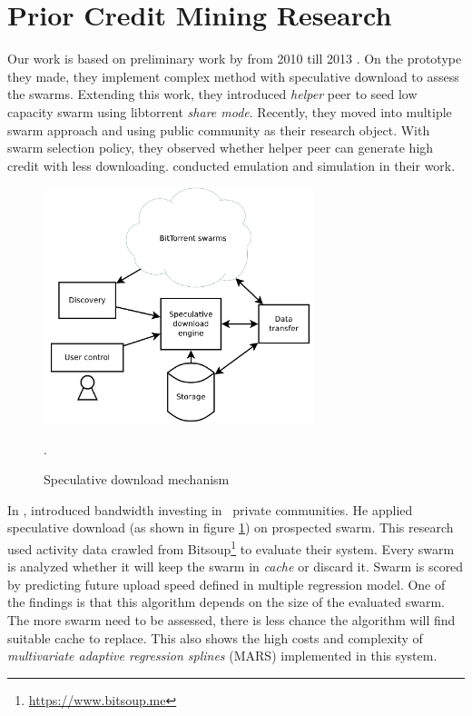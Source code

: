 

\section{Prior Credit Mining Research}
\label{section:cmprior}
Our work is based on preliminary work by \citeauthor{2015:creditmining:capota} from 2010 till 2013 \cite{2015:creditmining:capota, 2013:investmentcm:capota, 2014:bwmarket:capota}. On the prototype they made, they implement complex method with speculative download to assess the swarms\cite{2013:investmentcm:capota}. Extending this work, they introduced \textit{helper} peer to seed low capacity swarm using libtorrent \textit{share mode}\cite{2014:bwmarket:capota}. Recently, they moved into multiple swarm approach and using public community as their research object. With swarm selection policy, they observed whether helper peer can generate high credit with less downloading\cite{2015:creditmining:capota}. \citeauthor{2015:creditmining:capota} conducted emulation and simulation in their work.

\begin{figure}[t]
	\centering
	\includegraphics[width=0.7\textwidth]{pics/SDE2013.png}
	\caption{Speculative download mechanism \cite{2013:investmentcm:capota}}.
	\label{fig:sde13}
\end{figure}

In \citeyear{2013:investmentcm:capota}, \citeauthor{2013:investmentcm:capota} introduced bandwidth investing in \bt~private communities. He applied speculative download (as shown in figure \ref{fig:sde13}) on prospected swarm. This research used activity data crawled from Bitsoup\footnote{\url{https://www.bitsoup.me}} to evaluate their system. Every swarm is analyzed whether it will keep the swarm in \textit{cache} or discard it. Swarm is scored by predicting future upload speed defined in multiple regression model\cite{2013:investmentcm:capota}. One of the findings is that this algorithm depends on the size of the evaluated swarm. The more swarm need to be assessed, there is less chance the algorithm will find suitable cache to replace. This also shows the high costs and complexity of \textit{multivariate adaptive regression splines} (MARS) implemented in this system.

